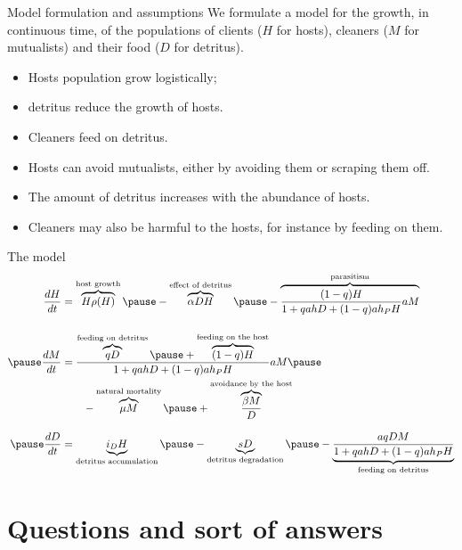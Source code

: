 \documentclass{beamer}
\begin{document}
\begin{frame}{Model formulation and assumptions}
    We formulate a model for the growth, in continuous time, of the
    populations of clients ($H$ for hosts), cleaners ($M$ for mutualists) and
    their food ($D$ for detritus).
            \pause
    \begin{itemize}
        \item Hosts population grow logistically;
            \pause
        \item detritus reduce the growth of hosts.
            \pause
        \item Cleaners feed on detritus.
            \pause
        \item Hosts can avoid mutualists, either by avoiding them or scraping
            them off.
            \pause
        \item The amount of detritus increases with the abundance of hosts.
            \pause
        \item Cleaners may also be harmful to the hosts, for instance by
            feeding on them.
    \end{itemize}
\end{frame}

\begin{frame}{The model}
\begin{align*}
    \frac{dH}{dt} &= \overbrace{H \rho(H)}^{\text{host growth}} \pause
        - \overbrace{\alpha DH}^\text{effect of detritus} \pause
        - \overbrace{\frac{(1-q)H}{1+qahD + (1-q)a h_P H}
    aM}^\text{parasitism} \\[3ex]
    \pause
    \frac{dM}{dt} &= \frac{\overbrace{qD}^\text{feeding on detritus} \pause +
    \overbrace{(1-q)H}^\text{feeding on the host}}{1+qahD + (1-q)a h_P H} aM \pause 
    \\ & \qquad {}
    - \overbrace{\mu M}^\text{natural mortality}\pause
    + \overbrace{\frac{\beta M}{D}}^\text{avoidance by the host}\\[2ex]
    \pause
    \frac{dD}{dt} &= \underbrace{i_D H}_\text{detritus accumulation} \pause -
    \underbrace{sD}_\text{detritus degradation} \pause - \underbrace{\frac{aqDM}{1+qahD + (1-q)a h_P H}}_\text{feeding on detritus}
\end{align*}
\end{frame}


\section{Questions and sort of answers}
\end{document}
